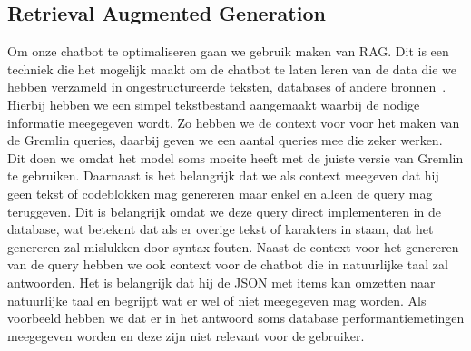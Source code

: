 \subsection{Retrieval Augmented Generation}
Om onze chatbot te optimaliseren gaan we gebruik maken van RAG.\@
Dit is een techniek die het mogelijk maakt om de chatbot te laten leren van de data die we hebben verzameld in ongestructureerde teksten, databases of andere bronnen~\autocite{Zeichick2023}.
Hierbij hebben we een simpel tekstbestand aangemaakt waarbij de nodige informatie meegegeven wordt.
Zo hebben we de context voor voor het maken van de Gremlin queries, daarbij geven we een aantal queries mee die zeker werken.
Dit doen we omdat het model soms moeite heeft met de juiste versie van Gremlin te gebruiken.
Daarnaast is het belangrijk dat we als context meegeven dat hij geen tekst of codeblokken mag genereren maar enkel en alleen de query mag teruggeven.
Dit is belangrijk omdat we deze query direct implementeren in de database, wat betekent dat als er overige tekst of karakters in staan, dat het genereren zal mislukken door syntax fouten.
Naast de context voor het genereren van de query hebben we ook context voor de chatbot die in natuurlijke taal zal antwoorden.
Het is belangrijk dat hij de JSON met items kan omzetten naar natuurlijke taal en begrijpt wat er wel of niet meegegeven mag worden.
Als voorbeeld hebben we dat er in het antwoord soms database performantiemetingen meegegeven worden en deze zijn niet relevant voor de gebruiker.